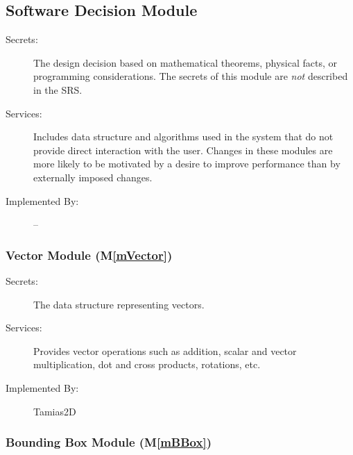 \documentclass[12pt]{article}
\newcommand{\mref}[1]{M\ref{#1}}
\newcommand{\olu}[1]{\authornote{red}{OO}{#1}}
\newcommand{\progname}{Tamias2D}
\begin{document}

\subsection{Software Decision Module}

\begin{description}
\item[Secrets:] The design decision based on mathematical theorems, physical
  facts, or programming considerations. The secrets of this module are
  \emph{not} described in the SRS.
\item[Services:] Includes data structure and algorithms used in the system that do not provide direct interaction with the user. 
  Changes in these modules are more likely to be motivated by a desire to
  improve performance than by externally imposed changes.
\item[Implemented By:] --
\end{description}

\subsubsection{Vector Module (\mref{mVector})}
	
\begin{description}
	\item[Secrets:] The data structure representing vectors.
	\item[Services:] Provides vector operations such as addition, scalar and vector multiplication, dot and cross products, rotations, etc.
	\item[Implemented By:] \progname
\end{description}

\subsubsection{Bounding Box Module (\mref{mBBox})}
\end{document}

